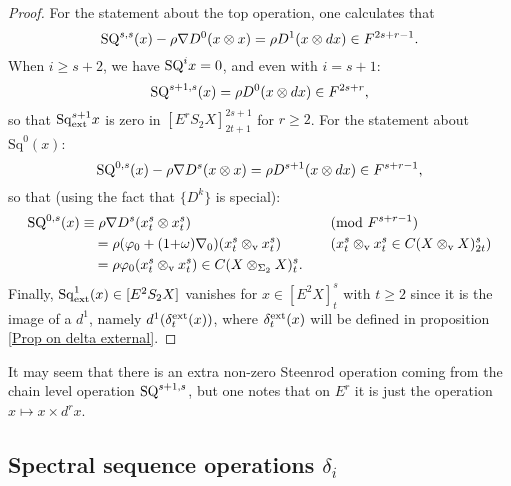 \documentclass[11pt]{amsart}
\theoremstyle{plain}
\newtheorem{prop}[thm]{Proposition}
\theoremstyle{definition}
\let\phi\varphi
\renewcommand{\to}{\longrightarrow}
\theoremstyle{plain}
\newcommand{\twist}{\omega}
\newcommand{\Nabla}{\nabla}
\newcommand{\Sq}{\mathrm{Sq}}
\newcommand{\E}[5]{[E^{#1}_{#2}#3]^{#4}_{#5}}
\begin{document}
\begin{second quadrant homotopy}
\begin{proof}
For the statement about the top operation, one calculates that
\[\textup{SQ}^{s,s}(x)-\rho\Nabla D^0(x\otimes x)=\rho D^{1}(x\otimes dx)\in F^{2s+r-1}.\]
When $i\geq s+2$, we have $\textup{SQ}^{i}x=0$, and even with $i=s+1$:
\[\textup{SQ}^{s+1,s}(x)=\rho D^{0}(x\otimes dx)\in F^{2s+r},\]
so that $\Sq^{s+1}_\textup{ext}x$ is zero in $\E{r}{}{S_2X}{2s+1}{2t+1}$ for $r\geq2$.
For the statement about $\Sq^0(x)$:
\[\textup{SQ}^{0,s}(x)-\rho\Nabla D^s(x\otimes x)=\rho D^{s+1}(x\otimes dx)\in F^{s+r-1},\]
so that (using the fact that $\{D^k\}$ is special):
\begin{alignat*}{2}
\textup{SQ}^{0,s}(x)
&\equiv
\rho\Nabla D^s(x^s_t\otimes x^s_t)&&\textup{(mod $F^{s+r-1}$)}%
\\
&\quad =
\rho(\phi_0+(1{+}\twist)\Nabla_0)(x^s_t\otimes_\textup{v} x^s_t)%
&\quad&\text{($x^s_t\otimes_\textup{v} x^s_t\in C(X\otimes_\textup{v}X)_{2t}^{s}$)}\\
&\quad =
\rho\phi_0(x^s_t\otimes_\textup{v} x^s_t)\in C(X\otimes_{\Sigma_2} X)_{t}^{s}.
\end{alignat*}
Finally, $\Sq^1_\textup{ext}(x)\in\E{2}{}{S_2X}{}{}$ vanishes for $x\in \E{2}{}{X}{s}{t}$ with $t\geq2$ since it is the image of a $d^1$, namely $d^1(\delta_t^\textup{ext}(x))$, where $\delta_t^\textup{ext}(x)$ will be defined in proposition \ref{Prop on delta external}.
\end{proof}
It may seem that there is an extra non-zero Steenrod operation coming from the chain level operation $\textup{SQ}^{s+1,s}$, but one notes that on $E^r$ it is just the operation $x\mapsto x\times d^rx$.

\subsection{Spectral sequence operations $\delta_i$}


\end{second quadrant homotopy}
\end{document}
